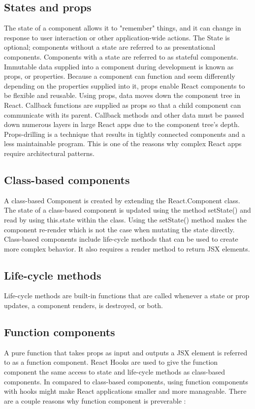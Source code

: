 \subsection{States and props}
The state of a component allows it to "remember" things, and it can change in response to user interaction or other application-wide actions. The State is optional; components without a state are referred to as presentational components. Components with a state are referred to as stateful components.
Immutable data supplied into a component during development is known as props, or properties. Because a component can function and seem differently depending on the properties supplied into it, props enable React components to be flexible and reusable.
Using props, data moves down the component tree in React. Callback functions are supplied as props so that a child component can communicate with its parent. Callback methods and other data must be passed down numerous layers in large React apps due to the component tree's depth. Props-drilling is a technique that results in tightly connected components and a less maintainable program. This is one of the reasons why complex React apps require architectural patterns.

\subsection{Class-based components}
A class-based Component is created by extending the React.Component class. The state of a class-based component is updated using the method setState() and read by using this.state within the class. Using the setState() method makes the component re-render which is not the case when mutating the state directly. Class-based components include life-cycle methods that can be used to create more complex behavior. It also requires a render method to return JSX elements.

\subsection{Life-cycle methods}
Life-cycle methods are built-in functions that are called whenever a state or prop updates, a component renders, is destroyed, or both.

\subsection{Function components}
A pure function that takes props as input and outputs a JSX element is referred to as a function component. React Hooks are used to give the function component the same access to state and life-cycle methods as class-based components. In compared to class-based components, using function components with hooks might make React applications smaller and more manageable. There are a couple reasons why function component is preverable \autocite{phan2020react}:

